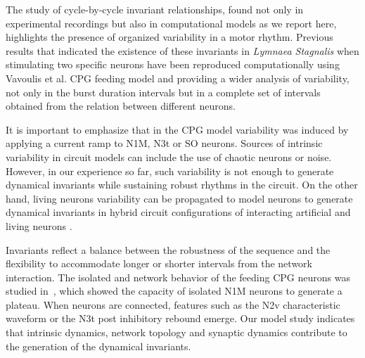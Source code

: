 The study of cycle-by-cycle invariant relationships, found not only in experimental recordings but also in computational models as we report here, highlights the presence
of organized variability in a motor rhythm. Previous results that indicated the existence of these invariants in \textit{Lymnaea Stagnalis} when stimulating two specific neurons have been reproduced computationally using Vavoulis et al. CPG feeding model and providing a wider analysis of variability, not only in the burst duration intervals but in a complete set of intervals obtained from the relation between different neurons.%

It is important to emphasize that in the CPG model variability was induced by applying a current ramp to N1M, N3t or SO neurons. Sources of intrinsic variability in circuit models can include the use of chaotic neurons \cite{elices_closed-loop_2015,elices_asymmetry_2017} or noise. However, in our experience so far, such variability is not enough to generate dynamical invariants while sustaining robust rhythms in the circuit. On the other hand, living neurons variability can be propagated to model neurons to generate dynamical invariants in hybrid circuit configurations of interacting artificial and living neurons \cite{amaducci_rthybrid_2019,reyes-sanchez_automatic_2020}.

Invariants reflect a balance between the robustness of the sequence and the flexibility to accommodate longer or shorter intervals from the network interaction. The isolated and network behavior of the feeding CPG neurons was studied in~\cite{straub_endogenous_2002}, which showed the capacity of isolated N1M neurons to generate a plateau. When neurons are connected, features such as the N2v characteristic waveform or the N3t post inhibitory rebound emerge. Our model study indicates that intrinsic dynamics, network topology and synaptic dynamics contribute to the generation of the dynamical invariants.



